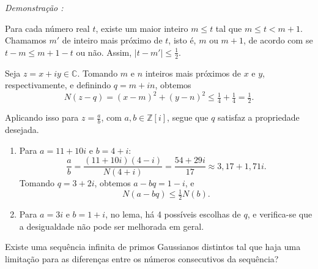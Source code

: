     \textit{Demonstração : }

    Para cada número real $t$, existe um maior inteiro $m \leq t$ tal que $m \leq t < m+1$.  
    Chamamos $m'$ de inteiro mais próximo de $t$, isto é, $m$ ou $m+1$, de acordo com se $t-m \leq m+1-t$ ou não.  
    Assim, $|t - m'| \leq \tfrac{1}{2}$.  

    Seja $z = x + iy \in \mathbb{C}$. Tomando $m$ e $n$ inteiros mais próximos de $x$ e $y$, respectivamente, e definindo $q = m + in$, obtemos
    \[
    N(z - q) = (x-m)^2 + (y-n)^2 \leq \tfrac{1}{4} + \tfrac{1}{4} = \tfrac{1}{2}.
    \]

    Aplicando isso para $z = \tfrac{a}{b}$, com $a,b \in \mathbb{Z}[i]$, segue que $q$ satisfaz a propriedade desejada.

    \begin{exemplo}
        \begin{enumerate}
            \item Para $a = 11 + 10i$ e $b = 4+i$:
            \[
                \frac{a}{b} = \frac{(11+10i)(4-i)}{N(4+i)} = \frac{54+29i}{17} \approx 3{,}17 + 1{,}71i.
            \]
            Tomando $q = 3 + 2i$, obtemos $a - bq = 1 - i$, e
            \[
                N(a-bq) \leq \tfrac{1}{2}N(b).
            \]

            \item Para $a = 3i$ e $b = 1+i$, no lema, há 4 possíveis escolhas de $q$, e verifica-se que a desigualdade não pode ser melhorada em geral.
        \end{enumerate}
    \end{exemplo}


    \begin{questao}
        Existe uma sequência infinita de primos Gaussianos distintos tal que haja uma 
        limitação para as diferenças entre os números consecutivos da sequência?
    \end{questao}
